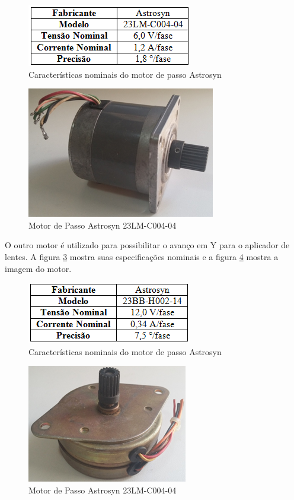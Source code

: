 \begin{figure}[H]
		\centering
			\includegraphics[scale=1.0]{figuras/tabmotor1.png}
		\caption{Características nominais do motor de passo Astrosyn}
		\label{tabmotor1}
\end{figure}

\begin{figure}[H]
		\centering
			\includegraphics[scale=1.0]{figuras/motor1.png}
		\caption{Motor de Passo Astrosyn 23LM-C004-04}
		\label{motor1}
\end{figure}

O outro motor é utilizado para possibilitar o avanço em Y para o aplicador de lentes. A figura \ref{tabmotor2} mostra suas especificações nominais e a figura \ref{motor2} mostra a imagem do motor.

\begin{figure}[H]
		\centering
			\includegraphics[scale=1.0]{figuras/tabmotor2.png}
		\caption{Características nominais do motor de passo Astrosyn}
		\label{tabmotor2}
\end{figure}

\begin{figure}[H]
		\centering
			\includegraphics[scale=1.0]{figuras/motor2.png}
		\caption{Motor de Passo Astrosyn 23LM-C004-04}
		\label{motor2}
\end{figure}

